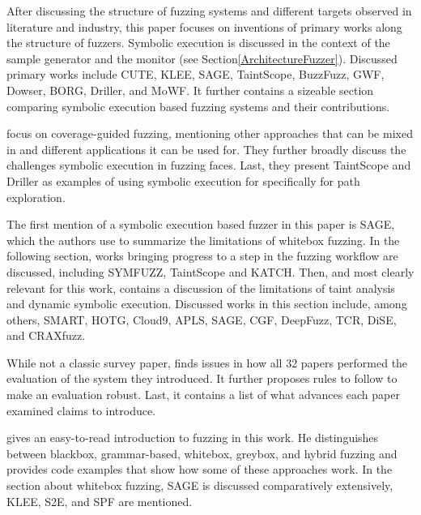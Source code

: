 \documentclass{article}
\begin{document}
\begin{multicols}{2}
  After discussing the structure of fuzzing systems and different targets observed in literature and industry, this paper focuses on inventions of primary works along the structure of fuzzers. Symbolic execution is discussed in the context of the sample generator and the monitor (see Section\ref{ArchitectureFuzzer}). Discussed primary works include CUTE\cite{CUTE}, KLEE\cite{KLEE}, SAGE\cite{SAGE}, TaintScope\cite{TaintScope}, BuzzFuzz\cite{BuzzFuzz}, GWF\cite{GWF}, Dowser\cite{Dowser}, BORG\cite{BORG}, Driller\cite{Driller}, and MoWF\cite{MoWF}. It further contains a sizeable section comparing symbolic execution based fuzzing systems and their contributions.

  \citeauthor{FuzzingASurvey} focus on coverage-guided fuzzing, mentioning other approaches that can be mixed in and different applications it can be used for. They further broadly discuss the challenges symbolic execution in fuzzing faces. Last, they present TaintScope\cite{TaintScope} and Driller\cite{Driller} as examples of using symbolic execution for specifically for path exploration.

  The first mention of a symbolic execution based fuzzer in this paper is SAGE\cite{SAGE}, which the authors use to summarize the limitations of whitebox fuzzing. In the following section, works bringing progress to a step in the fuzzing workflow are discussed, including SYMFUZZ\cite{SYMFUZZ}, TaintScope\cite{TaintScope} and KATCH\cite{KATCH}. Then, and most clearly relevant for this work,  contains a discussion of the limitations of taint analysis and dynamic symbolic execution. Discussed works in this section include, among others,  SMART\cite{SMART}, HOTG\cite{HigherOrderTestGeneration}, Cloud9\cite{Cloud9}, APLS\cite{APLS}, SAGE\cite{SAGE}, CGF\cite{CGF}, DeepFuzz\cite{DeepFuzz}, TCR\cite{TCR}, DiSE\cite{DiSE}, and CRAXfuzz\cite{CRAXfuzz}.

  While not a classic survey paper,  finds issues in how all 32 papers performed the evaluation of the system they introduced. It further proposes rules to follow to make an evaluation robust. Last, it contains a list of what advances each paper examined claims to introduce.

  \citeauthor{HackArtScience} gives an easy-to-read introduction to fuzzing in this work. He distinguishes between blackbox, grammar-based, whitebox, greybox, and hybrid fuzzing and provides code examples that show how some of these approaches work. In the section about whitebox fuzzing, SAGE\cite{SAGE} is discussed comparatively extensively, KLEE\cite{KLEE}, S2E\cite{S2E}, and SPF\cite{SPF} are mentioned.


\end{multicols}
\end{document}
